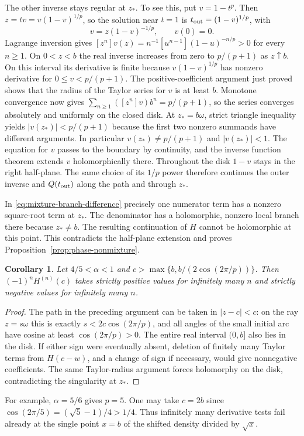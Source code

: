 \documentclass[11pt,a4paper]{article}
\newtheorem{corollary}[theorem]{Corollary}
\numberwithin{equation}{section}
\begin{document}
The other inverse stays regular at $z_*$. To see this, put
$v=1-t^p$. Then $z=t v=v(1-v)^{1/p}$, so the solution near $t=1$
is $t_{\rm out}=(1-v)^{1/p}$, with
\[
                 v=z(1-v)^{-1/p},\qquad v(0)=0.
\]
Lagrange inversion gives
$[z^n]v(z)=n^{-1}[u^{n-1}](1-u)^{-n/p}>0$ for every $n\ge1$.
On $0<z<b$ the real inverse increases from zero to $p/(p+1)$
as $z\uparrow b$. On this interval its derivative is finite because
$v(1-v)^{1/p}$ has nonzero derivative for $0\le v<p/(p+1)$.
The positive-coefficient argument just proved shows that the radius
of the Taylor series for $v$ is at least $b$. Monotone convergence now
gives $\sum_{n\ge1}([z^n]v)b^n=p/(p+1)$, so the series converges
absolutely and uniformly on the closed disk. At $z_*=b\omega$,
strict triangle inequality yields $|v(z_*)|<p/(p+1)$ because the
first two nonzero summands have different arguments. In particular
$v(z_*)\ne p/(p+1)$ and $|v(z_*)|<1$. The equation for $v$ passes
to the boundary by continuity, and the inverse function theorem
extends $v$ holomorphically there. Throughout the disk $1-v$ stays
in the right half-plane. The same choice of its $1/p$ power therefore
continues the outer inverse and $Q(t_{\rm out})$ along the path and
through $z_*$. 

In \eqref{eq:mixture-branch-difference} precisely one numerator term
has a nonzero square-root term at $z_*$. The denominator has a
holomorphic, nonzero local branch there because $z_*\ne b$.
The resulting continuation of $H$ cannot be holomorphic at this
point. This contradicts the half-plane extension and proves
Proposition~\ref{prop:phase-nonmixture}.

\begin{corollary}\label{cor:oscillate}
Let $4/5<\alpha<1$ and
$c>\max\{b,b/(2\cos(2\pi/p))\}$. Then
$(-1)^n H^{(n)}(c)$ takes strictly positive values for infinitely many
$n$ and strictly negative values for infinitely many $n$.
\end{corollary}
\begin{proof}
The path in the preceding argument can be taken in $|z-c|<c$:
on the ray $z=s\omega$ this is exactly $s<2c\cos(2\pi/p)$,
and all angles of the small initial arc have cosine at least
$\cos(2\pi/p)>0$. The entire real interval $(0,b]$ also lies in
the disk. If either sign were eventually absent, deletion of finitely
many Taylor terms from $H(c-w)$, and a change of sign if necessary,
would give nonnegative coefficients. The same Taylor-radius argument
forces holomorphy on the disk, contradicting the singularity at $z_*$.
\end{proof}
For example, $\alpha=5/6$ gives $p=5$. One may take $c=2b$ since
$\cos(2\pi/5)=(\sqrt5-1)/4>1/4$. Thus infinitely many derivative
tests fail already at the single point $x=b$ of the shifted density
divided by $\sqrt{x}$.
\end{document}
